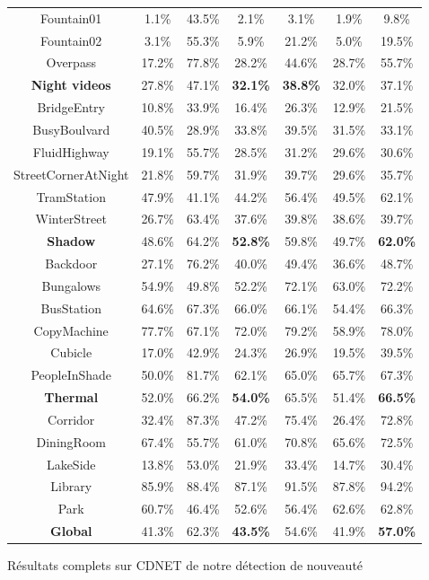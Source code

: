 \begin{tableth}
\begin{tabular}{|c|c|c|c|c|c|c|}
		Fountain01 & 1.1\% & 43.5\% & 2.1\% & 3.1\% & 1.9\% & 9.8\% \\
		Fountain02 & 3.1\% & 55.3\% & 5.9\% & 21.2\% & 5.0\% & 19.5\% \\
		Overpass & 17.2\% & 77.8\% & 28.2\% & 44.6\% & 28.7\% & 55.7\% \\
		\hline
        \textbf{Night videos} & 27.8\% & 47.1\% & \textbf{32.1\%} & \textbf{38.8\%} & 32.0\% & 37.1\% \\
		\hline
		BridgeEntry & 10.8\% & 33.9\% & 16.4\% & 26.3\% & 12.9\% & 21.5\% \\
		BusyBoulvard & 40.5\% & 28.9\% & 33.8\% & 39.5\% & 31.5\% & 33.1\% \\
		FluidHighway & 19.1\% & 55.7\% & 28.5\% & 31.2\% & 29.6\% & 30.6\% \\
		StreetCornerAtNight & 21.8\% & 59.7\% & 31.9\% & 39.7\% & 29.6\% & 35.7\% \\
		TramStation & 47.9\% & 41.1\% & 44.2\% & 56.4\% & 49.5\% & 62.1\% \\
		WinterStreet & 26.7\% & 63.4\% & 37.6\% & 39.8\% & 38.6\% & 39.7\% \\
		\hline
        \textbf{Shadow} & 48.6\% & 64.2\% & \textbf{52.8\%} & 59.8\% & 49.7\% & \textbf{62.0\%} \\
		\hline
		Backdoor & 27.1\% & 76.2\% & 40.0\% & 49.4\% & 36.6\% & 48.7\% \\
		Bungalows & 54.9\% & 49.8\% & 52.2\% & 72.1\% & 63.0\% & 72.2\% \\
		BusStation & 64.6\% & 67.3\% & 66.0\% & 66.1\% & 54.4\% & 66.3\% \\
		CopyMachine & 77.7\% & 67.1\% & 72.0\% & 79.2\% & 58.9\% & 78.0\% \\
		Cubicle & 17.0\% & 42.9\% & 24.3\% & 26.9\% & 19.5\% & 39.5\% \\
		PeopleInShade & 50.0\% & 81.7\% & 62.1\% & 65.0\% & 65.7\% & 67.3\% \\
		\hline
        \textbf{Thermal} & 52.0\% & 66.2\% & \textbf{54.0\%} & 65.5\% & 51.4\% & \textbf{66.5\%} \\
		\hline
		Corridor & 32.4\% & 87.3\% & 47.2\% & 75.4\% & 26.4\% & 72.8\% \\
		DiningRoom & 67.4\% & 55.7\% & 61.0\% & 70.8\% & 65.6\% & 72.5\% \\
		LakeSide & 13.8\% & 53.0\% & 21.9\% & 33.4\% & 14.7\% & 30.4\% \\
		Library & 85.9\% & 88.4\% & 87.1\% & 91.5\% & 87.8\% & 94.2\% \\
		Park & 60.7\% & 46.4\% & 52.6\% & 56.4\% & 62.6\% & 62.8\% \\
		\hline
        \textbf{Global} & 41.3\% & 62.3\% & \textbf{43.5\%} & 54.6\% & 41.9\% & \textbf{57.0\%} \\
    	\hline
	\end{tabular}
	\caption{Résultats complets sur CDNET de notre détection de nouveauté}
	\label{tab:res:complet1}
	\end{tableth}


